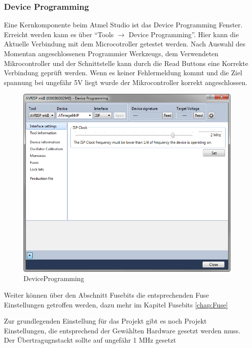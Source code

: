 \subsubsection{Device Programming}
\label{Chap:atmelStudio.Programming}

Eine Kernkomponente beim Atmel Studio ist das Device Programming Fenster.
Erreicht werden kann es über "`Tools $\to$  Device Programming"'.
Hier kann die Aktuelle Verbindung mit dem Microcotroller getestet werden. Nach
Auswahl des Momentan angeschlossenen Programmier Werkzeugs, dem Verwendeten
Mikrocontroller und der Schnittstelle kann durch die Read Buttons eine Korrekte Verbindung
geprüft werden. Wenn es keiner Fehlermeldung kommt und die Ziel spannung bei
ungefähr 5V liegt wurde der Mikrocontroller korrekt angeschlossen.

\begin{figure}[H]
\centering
\includegraphics[width=13cm]{content/pictures/Anleitung/neuerProzessor/AnleitungNeuerProzessor1.png}
\caption{DeviceProgramming}
\label{fig:B3}
\end{figure}

Weiter können über den Abschnitt Fusebits die entsprechenden Fuse Einstellungen
getroffen werden, dazu mehr im Kapitel Fusebits \ref{chap:Fuse}

Zur grundlegenden Einstellung für das Projekt gibt es noch Projekt
Einstellungen, die entsprechend der Gewählten Hardware gesetzt werden muss. Der Übertragugnstackt sollte auf ungefähr 1 MHz gesetzt

